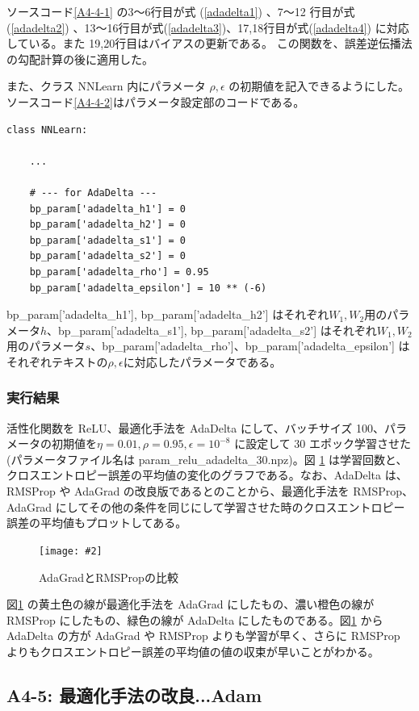 \documentclass[a4paper,dvipdfmx]{jsarticle}
\newcommand{\image}[3]{
    \begin{figure}[H]
        \begin{center}
        \texttt{[image: \#2]}
        \end{center}
        \caption{#1}
        \label{#3}
    \end{figure}
}
\begin{document}
ソースコード\ref{A4-4-1} の3〜6行目が式 (\ref{adadelta1}) 、7〜12 行目が式 (\ref{adadelta2}) 、13〜16行目が式(\ref{adadelta3})、17,18行目が式(\ref{adadelta4}) に対応している。また 19,20行目はバイアスの更新である。
この関数を、誤差逆伝播法の勾配計算の後に適用した。

また、クラス NNLearn 内にパラメータ $\rho, \epsilon$ の初期値を記入できるようにした。ソースコード\ref{A4-4-2}はパラメータ設定部のコードである。
\begin{lstlisting}[caption="AdaDelta のパラメータ設定部",label=A4-4-2]
class NNLearn:

	...
	
    # --- for AdaDelta ---
    bp_param['adadelta_h1'] = 0
    bp_param['adadelta_h2'] = 0
    bp_param['adadelta_s1'] = 0
    bp_param['adadelta_s2'] = 0
    bp_param['adadelta_rho'] = 0.95
    bp_param['adadelta_epsilon'] = 10 ** (-6)
\end{lstlisting}

bp\_param['adadelta\_h1'], bp\_param['adadelta\_h2'] はそれぞれ$W_1, W_2$用のパラメータ$h$、bp\_param['adadelta\_s1'], bp\_param['adadelta\_s2'] はそれぞれ$W_1, W_2$用のパラメータ$s$、bp\_param['adadelta\_rho']、bp\_param['adadelta\_epsilon'] はそれぞれテキストの$\rho, \epsilon$に対応したパラメータである。

\subsubsection*{実行結果}

活性化関数を ReLU、最適化手法を AdaDelta にして、バッチサイズ 100、パラメータの初期値を$\eta = 0.01, \rho = 0.95, \epsilon = 10^{-8}$ に設定して 30 エポック学習させた(パラメータファイル名は param\_relu\_adadelta\_30.npz)。図 \ref{fig-A4-4-1} は学習回数と、クロスエントロピー誤差の平均値の変化のグラフである。なお、AdaDelta は、RMSProp や AdaGrad の改良版であるとのことから、最適化手法を RMSProp、AdaGrad にしてその他の条件を同じにして学習させた時のクロスエントロピー誤差の平均値もプロットしてある。

\image{AdaGradとRMSPropの比較}{report_a4-4.png}{fig-A4-4-1}

図\ref{fig-A4-4-1} の黄土色の線が最適化手法を AdaGrad にしたもの、濃い橙色の線が RMSProp にしたもの、緑色の線が AdaDelta にしたものである。図\ref{fig-A4-4-1} から AdaDelta の方が AdaGrad や RMSProp よりも学習が早く、さらに RMSProp よりもクロスエントロピー誤差の平均値の値の収束が早いことがわかる。

\subsection*{A4-5: 最適化手法の改良...Adam}
\end{document}
